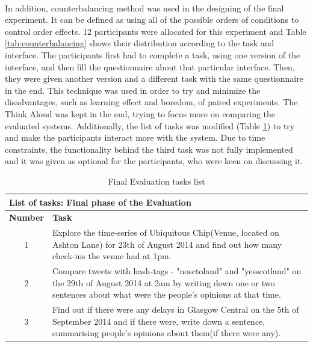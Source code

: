 \documentclass{l4proj}
\begin{document}
\paragraph{} 
In addition, counterbalancing method was used in the designing of the final experiment. It can be defined as using all of the possible orders of conditions to control order effects\cite{counterbalancing}. 12 participants were allocated for this experiment and Table \ref{tab:counterbalancing} shows their distribution according to the task and interface. The participants first had to complete a task, using one version of the interface, and then fill the questionnaire about that particular interface. Then, they were given another version and a different task with the same questionnaire in the end. This technique was used in order to try and minimize the disadvantages, such as learning effect and boredom, of paired experiments. The Think Aloud was kept in the end, trying to focus more on comparing the evaluated systems. Additionally, the list of tasks was modified (Table \ref{tab:finalevaltasks}) to try and make the participants interact more with the system. Due to time constraints, the functionality behind the third task was not fully implemented and it was given as optional for the participants, who were keen on discussing it.     

\begin{table}[H]
	\centering
	\begin{adjustbox}{width=1\textwidth}
		\begin{tabular}{|c|p{14cm}|}\hline
			\multicolumn{2}{|l|}{\textbf{List of tasks: Final phase of the Evaluation}} \\\hline
			\textbf{Number} & \textbf{Task} \\ \hline
			1
			&
			Explore the time-series of Ubiquitous Chip(Venue, located on Ashton Lane) for 23th of August 2014 and find out how many check-ins the venue had at 1pm.
			\tabularnewline\hline
			2
			&
			Compare tweets with hash-tags - "nosctoland" and "yesscotland" on the 29th of August 2014 at 2am by writing down one or two sentences about what were the people's opinions at that time.
			\tabularnewline\hline
			3
			&
			Find out if there were any delays in Glasgow Central on the 5th of September 2014 and if there were, write down a sentence, summarising people's opinions about them(if there were any).
			\tabularnewline\hline
		\end{tabular}
	\end{adjustbox}
	\caption{Final Evaluation tasks list}
	\label{tab:finalevaltasks}
\end{table}
\end{document}
